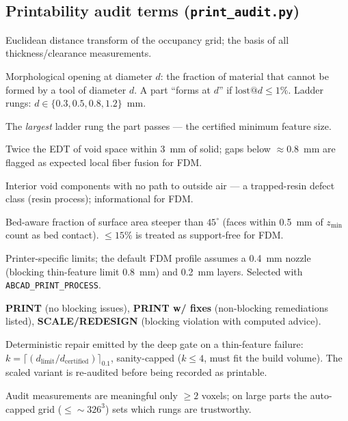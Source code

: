 \documentclass[11pt]{article}
\newcommand{\term}[1]{\textbf{#1}}
\begin{document}
\subsection{Printability audit terms (\texttt{print\_audit.py})}
\begin{description}[style=nextline,itemsep=0.35em]
  \item[EDT] Euclidean distance transform of the occupancy grid; the basis of all
    thickness/clearance measurements.
  \item[Formability ladder, $\mathrm{lost}@d$] Morphological opening at diameter $d$:
    the fraction of material that cannot be formed by a tool of diameter $d$. A part
    ``forms at $d$'' if $\mathrm{lost}@d \le 1\%$. Ladder rungs: $d \in \{0.3, 0.5, 0.8, 1.2\}$~mm.
  \item[max\_formable\_d] The \emph{largest} ladder rung the part passes --- the certified
    minimum feature size.
  \item[Clearance / fusion ladder] Twice the EDT of void space within 3~mm of solid;
    gaps below $\approx$0.8~mm are flagged as expected local fiber fusion for FDM.
  \item[Enclosed voids] Interior void components with no path to outside air --- a
    trapped-resin defect class (resin process); informational for FDM.
  \item[Overhang fraction] Bed-aware fraction of surface area steeper than $45^\circ$
    (faces within 0.5~mm of $z_{\min}$ count as bed contact). $\le 15\%$ is treated as
    support-free for FDM.
  \item[Process profile] Printer-specific limits; the default FDM profile assumes a
    0.4~mm nozzle (blocking thin-feature limit 0.8~mm) and 0.2~mm layers. Selected with
    \texttt{ABCAD\_PRINT\_PROCESS}.
  \item[Verdicts] \term{PRINT} (no blocking issues), \term{PRINT w/ fixes} (non-blocking
    remediations listed), \term{SCALE/REDESIGN} (blocking violation with computed advice).
  \item[Auto-scale factor $k$] Deterministic repair emitted by the deep gate on a
    thin-feature failure: $k=\lceil (d_{\text{limit}} / d_{\text{certified}}) \rceil_{0.1}$,
    sanity-capped ($k \le 4$, must fit the build volume). The scaled variant is re-audited
    before being recorded as printable.
  \item[Trust floor] Audit measurements are meaningful only $\ge 2$ voxels; on large parts
    the auto-capped grid ($\le \sim 326^3$) sets which rungs are trustworthy.
\end{description}
\end{document}
